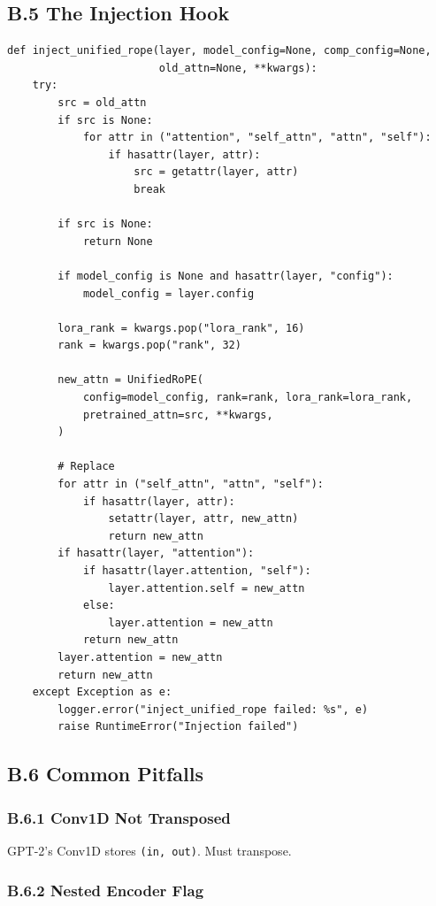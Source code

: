 \subsection{B.5 The Injection Hook}

\begin{lstlisting}
def inject_unified_rope(layer, model_config=None, comp_config=None,
                        old_attn=None, **kwargs):
    try:
        src = old_attn
        if src is None:
            for attr in ("attention", "self_attn", "attn", "self"):
                if hasattr(layer, attr):
                    src = getattr(layer, attr)
                    break
        
        if src is None:
            return None
        
        if model_config is None and hasattr(layer, "config"):
            model_config = layer.config
        
        lora_rank = kwargs.pop("lora_rank", 16)
        rank = kwargs.pop("rank", 32)
        
        new_attn = UnifiedRoPE(
            config=model_config, rank=rank, lora_rank=lora_rank,
            pretrained_attn=src, **kwargs,
        )
        
        # Replace
        for attr in ("self_attn", "attn", "self"):
            if hasattr(layer, attr):
                setattr(layer, attr, new_attn)
                return new_attn
        if hasattr(layer, "attention"):
            if hasattr(layer.attention, "self"):
                layer.attention.self = new_attn
            else:
                layer.attention = new_attn
            return new_attn
        layer.attention = new_attn
        return new_attn
    except Exception as e:
        logger.error("inject_unified_rope failed: %s", e)
        raise RuntimeError("Injection failed")
\end{lstlisting}

\subsection{B.6 Common Pitfalls}

\subsubsection{B.6.1 Conv1D Not Transposed}

GPT-2's Conv1D stores \texttt{(in, out)}. Must transpose.

\subsubsection{B.6.2 Nested Encoder Flag}

